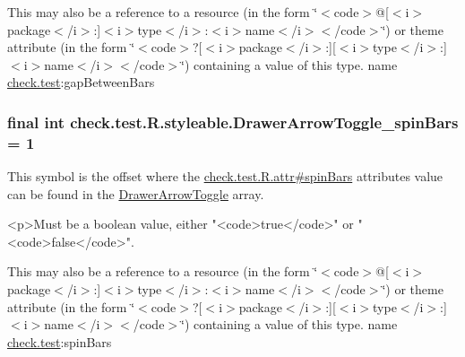 This may also be a reference to a resource (in the form \char`\"{}$<$code$>$@\mbox{[}$<$i$>$package$<$/i$>$\+:\mbox{]}$<$i$>$type$<$/i$>$\+:$<$i$>$name$<$/i$>$$<$/code$>$\char`\"{}) or theme attribute (in the form \char`\"{}$<$code$>$?\mbox{[}$<$i$>$package$<$/i$>$\+:\mbox{]}\mbox{[}$<$i$>$type$<$/i$>$\+:\mbox{]}$<$i$>$name$<$/i$>$$<$/code$>$\char`\"{}) containing a value of this type.  name \hyperlink{namespacecheck_1_1test}{check.\+test}\+:gap\+Between\+Bars \hypertarget{classcheck_1_1test_1_1_r_1_1styleable_a73da5fd0bc10c0ae2fa7bcb46d75899e}{}
\subsubsection[{Drawer\+Arrow\+Toggle\+\_\+spin\+Bars}]{\setlength{\rightskip}{0pt plus 5cm}final int check.\+test.\+R.\+styleable.\+Drawer\+Arrow\+Toggle\+\_\+spin\+Bars = 1\hspace{0.3cm}{\ttfamily [static]}}\label{classcheck_1_1test_1_1_r_1_1styleable_a73da5fd0bc10c0ae2fa7bcb46d75899e}
This symbol is the offset where the \hyperlink{classcheck_1_1test_1_1_r_1_1attr_a36af18fcdeac8b37c27afbf2e44385bf}{check.\+test.\+R.\+attr\#spin\+Bars} attribute\textquotesingle{}s value can be found in the \hyperlink{classcheck_1_1test_1_1_r_1_1styleable_a3bd2348d01049d5d42d5b7f277abeec9}{Drawer\+Arrow\+Toggle} array.

\begin{DoxyVerb}      <p>Must be a boolean value, either "<code>true</code>" or "<code>false</code>".
\end{DoxyVerb}
 

This may also be a reference to a resource (in the form \char`\"{}$<$code$>$@\mbox{[}$<$i$>$package$<$/i$>$\+:\mbox{]}$<$i$>$type$<$/i$>$\+:$<$i$>$name$<$/i$>$$<$/code$>$\char`\"{}) or theme attribute (in the form \char`\"{}$<$code$>$?\mbox{[}$<$i$>$package$<$/i$>$\+:\mbox{]}\mbox{[}$<$i$>$type$<$/i$>$\+:\mbox{]}$<$i$>$name$<$/i$>$$<$/code$>$\char`\"{}) containing a value of this type.  name \hyperlink{namespacecheck_1_1test}{check.\+test}\+:spin\+Bars \hypertarget{classcheck_1_1test_1_1_r_1_1styleable_a3245f5a85d7d25f1960c495b486d78e6}{}
